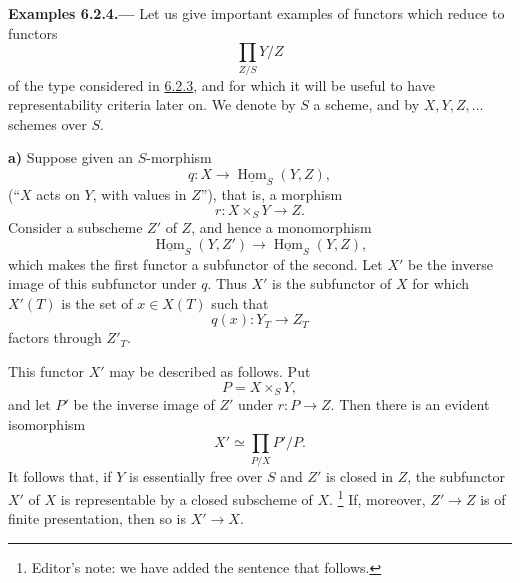 
\medskip
{}\label{ex:sga3-VIB-6.2.4}%
\noindent\textbf{Examples 6.2.4.---}
Let us give important examples of functors which reduce to
functors
\[
  \prod_{Z/S}Y/Z
\]
of the type considered in
\hyperref[thm:sga3-VIB-6.2.3]{6.2.3}, and for which it will be
useful to have representability criteria later on. We denote by
\(S\) a scheme, and by \(X,Y,Z,\ldots\) schemes over \(S\).

\medskip
{}\label{ex:sga3-VIB-6.2.4-a}%
\noindent\textbf{a)}
Suppose given an \(S\)-morphism
\begin{equation}
  q:X\longrightarrow\underline{\operatorname{Hom}}_S(Y,Z),
  \tag{x}\label{eq:sga3-VIB-6.2.4-x}
\end{equation}
(``\(X\) acts on \(Y\), with values in \(Z\)''), that is, a
morphism
\begin{equation}
  r:X\times_S Y\longrightarrow Z.
  \tag{xx}\label{eq:sga3-VIB-6.2.4-xx}
\end{equation}
Consider a subscheme \(Z'\) of \(Z\), and hence a monomorphism
\[
  \underline{\operatorname{Hom}}_S(Y,Z')
  \longrightarrow
  \underline{\operatorname{Hom}}_S(Y,Z),
\]
which makes the first functor a subfunctor of the second. Let
\(X'\) be the inverse image of this subfunctor under \(q\). Thus
\(X'\) is the subfunctor of \(X\) for which \(X'(T)\) is the set
of \(x\in X(T)\) such that
\[
  q(x):Y_T\longrightarrow Z_T
\]
factors through \(Z'_T\).

This functor \(X'\) may be described as follows. Put
\[
  P=X\times_S Y,
\]
and let \(P'\) be the inverse image of \(Z'\) under
\(r:P\to Z\). Then there is an evident isomorphism
\begin{equation}
  X'\simeq\prod_{P/X}P'/P.
  \tag{xxx}\label{eq:sga3-VIB-6.2.4-xxx}
\end{equation}
It follows that, if \(Y\) is essentially free over \(S\) and
\(Z'\) is closed in \(Z\), the subfunctor \(X'\) of \(X\) is
representable by a closed subscheme of \(X\).%
\footnote{\label{fnref:VI_B-56}\label{note:sga3-VIB-56}Editor's note: we have added the
sentence that follows.}
If, moreover, \(Z'\to Z\) is of finite presentation, then so is
\(X'\to X\).

